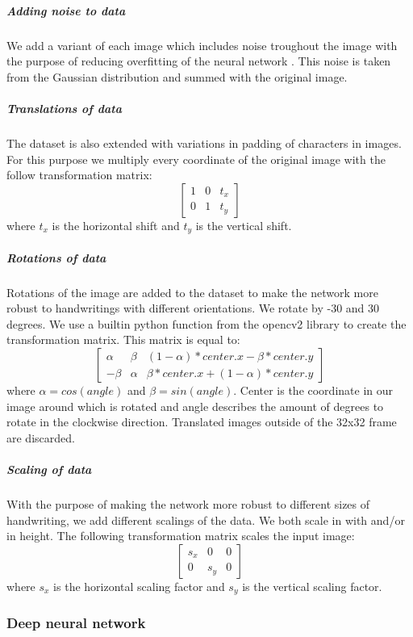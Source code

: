 \documentclass{article}
\begin{document}
\subparagraph{Adding noise to data}
We add a variant of each image which includes noise troughout the image with the purpose of reducing overfitting of the neural network \cite{DataNoise}. This noise is taken from the Gaussian distribution and summed with the original image.  
\subparagraph{Translations of data}
The dataset is also extended with variations in padding of characters in images. For this purpose we multiply every coordinate of the original image with the follow transformation matrix: 
\begin{equation}
        \begin{bmatrix}
                1 & 0 & t_x \\
                0 & 1 & t_y
        \end{bmatrix}
\end{equation}
where $t_x$ is the horizontal shift and $t_y$ is the vertical shift. 
\subparagraph{Rotations of data}
Rotations of the image are added to the dataset to make the network more robust to handwritings with different orientations. We rotate by -30 and 30 degrees. We use a builtin python function from the opencv2 library to create the transformation matrix. This matrix is equal to:
\begin{equation}
       \begin{bmatrix}
               \alpha & \beta & (1-\alpha)*center.x - \beta*center.y \\
               -\beta & \alpha & \beta*center.x + (1-\alpha)*center.y
       \end{bmatrix}
\end{equation}
where $\alpha = cos(angle)$ and $\beta = sin(angle)$. Center is the coordinate in our image around which is rotated and angle describes the amount of degrees to rotate in the clockwise direction. Translated images outside of the 32x32 frame are discarded.
\subparagraph{Scaling of data}
With the purpose of making the network more robust to different sizes of handwriting, we add different scalings of the data. We both scale in with and/or in height. The following transformation matrix scales the input image: 
\begin{equation}
       \begin{bmatrix}
               s_x & 0 & 0  \\
               0 & s_y & 0
       \end{bmatrix}
\end{equation}
where $s_x$ is the horizontal scaling factor and $s_y$ is the vertical scaling factor. 
\subsubsection{Deep neural network}
\label{sec:dnn}
\end{document}
